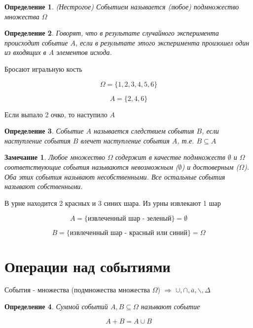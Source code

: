 \documentclass[a4paper, 14pt]{report}
\newtheorem{defenition}{Определение}[chapter]
\newtheorem{note}{Замечание}[chapter]
\begin{document}
    \begin{defenition}
        (Нестрогое) Событием называется (любое) подмножество множества $\Omega$
    \end{defenition}

    \begin{defenition}
        Говорят, что в результате случайного эксперимента происходит событие $A$, если в результате этого эксперимента произошел один из входящих в $A$ элементов исхода.
    \end{defenition}

    Бросают игральную кость

    $$
    \Omega = \{ 1,2,3,4,5,6 \}
    $$

    $$
    A = \{2,4,6\}
    $$

    Если выпало 2 очко, то наступило $A$

    \begin{defenition}
        Событие $A$ называется следствием события $B$, если наступление события $B$ влечет наступление события $A$, т.е. $B \subseteq A$
    \end{defenition}

    \begin{note}
        Любое множество $\Omega$ содержит в качестве подмножеств $\emptyset$ и $\Omega$ соответствующие события называются невозможным ($\emptyset$) и достоверным ($\Omega$). Оба этих события называют несобственными. Все остальные события называют собственными.
    \end{note}

    В урне находится 2 красных и 3 синих шара. Из урны извлекают 1 шар

    $$
    A = \{ \text{извлеченный шар - зеленый} \} = \emptyset
    $$

    $$
    B = \{ \text{извлеченный шар - красный или синий} \} = \Omega
    $$

    \section{Операции над событиями}

    События - множества (подмножества множества $\Omega$) $\Rightarrow$ $\cup, \cap, \overline{a}, \backslash, \Delta$ 

    \begin{defenition}
        Суммой событий $A,B \subseteq \Omega$ называют событие

        $$
        A + B = A \cup B
        $$
    \end{defenition}
\end{document}

